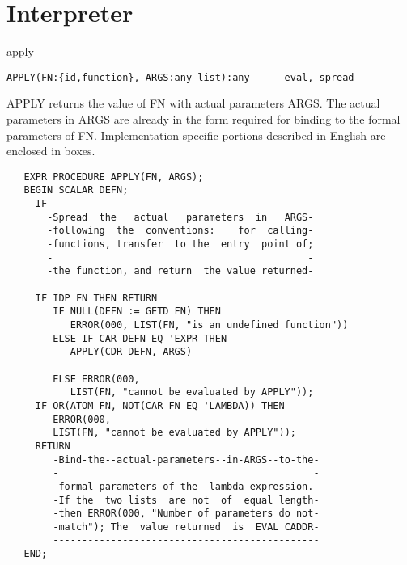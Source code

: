 \section{Interpreter}



\begin{Function}{apply}
\begin{verbatim}
APPLY(FN:{id,function}, ARGS:any-list):any      eval, spread
\end{verbatim}
   APPLY   returns  the  value  of   FN  with  actual  parameters
   ARGS.  The  actual  parameters  in  ARGS  are  already  in the
   form  required  for binding  to the  formal parameters  of FN.
   Implementation  specific  portions  described  in  English are
   enclosed in boxes.
\begin{verbatim}
   EXPR PROCEDURE APPLY(FN, ARGS);
   BEGIN SCALAR DEFN;
     IF---------------------------------------------
       -Spread  the   actual   parameters  in   ARGS-
       -following  the  conventions:    for  calling-
       -functions, transfer  to the  entry  point of;
       -                                            -
       -the function, and return  the value returned-
       ----------------------------------------------
     IF IDP FN THEN RETURN
        IF NULL(DEFN := GETD FN) THEN
           ERROR(000, LIST(FN, "is an undefined function"))
        ELSE IF CAR DEFN EQ 'EXPR THEN
           APPLY(CDR DEFN, ARGS)

        ELSE ERROR(000,
           LIST(FN, "cannot be evaluated by APPLY"));
     IF OR(ATOM FN, NOT(CAR FN EQ 'LAMBDA)) THEN
        ERROR(000,
        LIST(FN, "cannot be evaluated by APPLY"));
     RETURN
        -Bind-the--actual-parameters--in-ARGS--to-the-
        -                                            -
        -formal parameters of the  lambda expression.-
        -If the  two lists  are not  of  equal length-
        -then ERROR(000, "Number of parameters do not-
        -match"); The  value returned  is  EVAL CADDR-
        ----------------------------------------------
   END;
\end{verbatim}
\end{Function}
